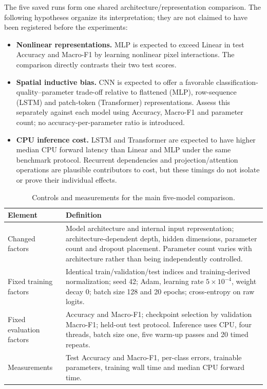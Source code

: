 The five saved runs form one shared architecture/representation comparison. The following hypotheses organize its interpretation; they are not claimed to have been registered before the experiments:
\begin{itemize}
\setlength{\itemsep}{4pt}\setlength{\parskip}{0pt}
\item \textbf{Nonlinear representations.} MLP is expected to exceed Linear in test Accuracy and Macro-F1 by learning nonlinear pixel interactions. The comparison directly contrasts their two test scores.
\item \textbf{Spatial inductive bias.} CNN is expected to offer a favorable classification-quality--parameter trade-off relative to flattened (MLP), row-sequence (LSTM) and patch-token (Transformer) representations. Assess this separately against each model using Accuracy, Macro-F1 and parameter count; no accuracy-per-parameter ratio is introduced.
\item \textbf{CPU inference cost.} LSTM and Transformer are expected to have higher median CPU forward latency than Linear and MLP under the same benchmark protocol. Recurrent dependencies and projection/attention operations are plausible contributors to cost, but these timings do not isolate or prove their individual effects.
\end{itemize}

\begin{table}[!htbp]\centering\small
\caption{Controls and measurements for the main five-model comparison.}
\label{tab:experiment-design}
\begin{tabularx}{\linewidth}{@{}p{29mm}X@{}}\toprule
Element & Definition\\\midrule
Changed factors & Model architecture and internal input representation; architecture-dependent depth, hidden dimensions, parameter count and dropout placement. Parameter count varies with architecture rather than being independently controlled.\\
Fixed training factors & Identical train/validation/test indices and training-derived normalization; seed 42; Adam, learning rate $5\times10^{-4}$, weight decay 0; batch size 128 and 20 epochs; cross-entropy on raw logits.\\
Fixed evaluation factors & Accuracy and Macro-F1; checkpoint selection by validation Macro-F1; held-out test protocol. Inference uses CPU, four threads, batch size one, five warm-up passes and 20 timed repeats.\\
Measurements & Test Accuracy and Macro-F1, per-class errors, trainable parameters, training wall time and median CPU forward time.\\\bottomrule
\end{tabularx}\end{table}

